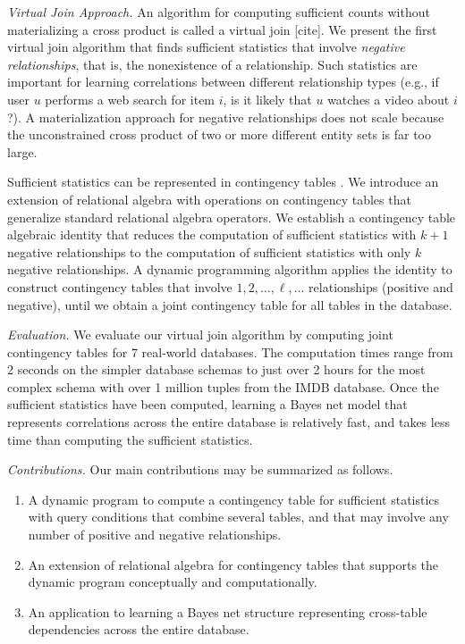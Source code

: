 \documentclass{vldb}
\begin{document}
\emph{Virtual Join Approach.} 
An algorithm for computing sufficient counts without materializing a cross product is called a virtual join [cite]. 
We present the first virtual join algorithm that finds sufficient statistics that involve {\em negative relationships}, that is, the nonexistence of a relationship.
Such statistics are important for learning correlations between different relationship types (e.g., if user $u$ performs a web search for item $i$, is it likely that $u$ watches a video about $i$?). 
A materialization approach for negative relationships does not scale because
the unconstrained cross product of two or more different entity sets is far too large.

Sufficient statistics can be represented in contingency tables \cite{Moore1998}. We introduce an extension of relational algebra with operations on contingency tables that generalize standard relational algebra operators. 
We establish a contingency table algebraic identity that reduces the computation of sufficient statistics with $k+1$ negative relationships to the computation of sufficient statistics with only $k$ negative relationships. 
A dynamic programming algorithm applies the identity to construct contingency tables that involve $1,2,\ldots,\ell,\ldots$ relationships (positive and negative), until we obtain a joint contingency table for all tables in the database. 

\emph{Evaluation.} We evaluate our virtual join algorithm by computing joint contingency tables for 7 real-world databases. The computation times range from 2 seconds on the simpler database schemas to just over 2 hours for the most complex schema with over 1 million tuples from the IMDB database. Once the sufficient statistics have been computed, learning a Bayes net model that represents correlations across the entire database is relatively fast, and takes less time than computing the sufficient statistics.

\emph{Contributions.} Our main contributions may be summarized as follows.

\begin{enumerate}
\item A dynamic program to compute a contingency table for sufficient statistics with query conditions that combine several tables, and that may involve any number of positive and negative relationships.
\item An extension of relational algebra for contingency tables that supports the dynamic program conceptually and computationally.
\item An application to learning a Bayes net structure representing cross-table dependencies across the entire database.
\end{enumerate}
\end{document}
